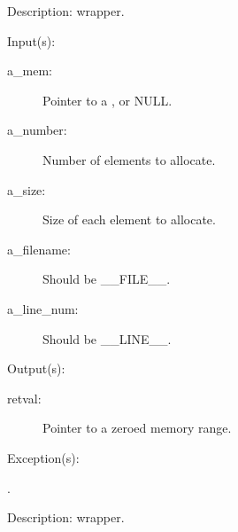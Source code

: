 \begin{capi}
\begin{capilist}
\begin{description}
		\end{description}
	\item[Description: ]
		 wrapper.
	\end{capilist}
\label{mem_calloc_e}
\label{mem_calloc}
\label{cw_calloc}
	\begin{capilist}
	\item[Input(s): ]
		\begin{description}\item[]
		\item[a\_mem: ]
			Pointer to a , or NULL.
		\item[a\_number: ]
			Number of elements to allocate.
		\item[a\_size: ]
			Size of each element to allocate.
		\item[a\_filename: ]
			Should be \_\_FILE\_\_.
		\item[a\_line\_num: ]
			Should be \_\_LINE\_\_.
		\end{description}
	\item[Output(s): ]
		\begin{description}\item[]
		\item[retval: ]
			Pointer to a zeroed memory range.
		\end{description}
	\item[Exception(s): ]
		\begin{description}\item[]
		\item[.]
		\end{description}
	\item[Description: ]
		 wrapper.
	\end{capilist}
\label{mem_realloc_e}
\label{mem_realloc}
\end{capi}

